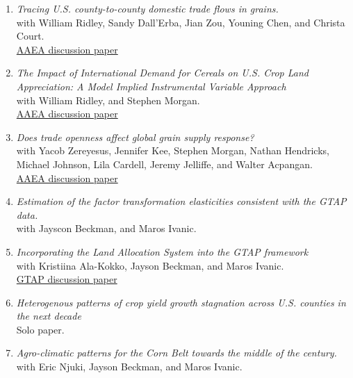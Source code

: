 \documentclass[11pt]{article}
\makeatletter
\newlength{\bibhang}
\newlength{\bibsep}
 {\@listi \global\bibsep\itemsep \global\advance\bibsep by\parsep}
\newenvironment{bibsection}%
        {\begin{enumerate}{}{%
       \setlength{\leftmargin}{\bibhang}%
       \setlength{\itemindent}{-\leftmargin}%
       \setlength{\itemsep}{\bibsep}%
       \setlength{\parsep}{\z@}%
        \setlength{\partopsep}{0pt}%
        \setlength{\topsep}{0pt}}}
        {\end{enumerate}\vspace{-.6\baselineskip}}
\makeatother
\begin{document}
\vspace{-.29cm} %

\begin{bibsection}
	
	\item {\textit{Tracing U.S. county-to-county domestic trade flows in grains.}} 
	\\with William Ridley, Sandy Dall'Erba, Jian Zou, Youning Chen, and Christa Court.
	\\ \href{https://ageconsearch.umn.edu/record/343526/files/27825.pdf}{AAEA discussion paper}
	
	
	\item {\textit{The Impact of International Demand for Cereals on U.S. Crop Land Appreciation: A Model Implied Instrumental Variable Approach}} 
	\\with William Ridley, and Stephen Morgan.
	\\ \href{https://ageconsearch.umn.edu/record/339478/files/Session%202%20Paper%201%20-%20Nava.pdf}{AAEA discussion paper}
	
	\item {\textit{Does trade openness affect global grain supply response?}}
	\\with Yacob Zereyesus, Jennifer Kee, Stephen Morgan, Nathan Hendricks, Michael Johnson, Lila Cardell, Jeremy Jelliffe, and Walter Acpangan.
	\\ \href{https://ageconsearch.umn.edu/record/335666/files/26732.pdf}{AAEA discussion paper}
	
	\item {\textit{Estimation of the factor transformation elasticities consistent with the GTAP data.}} 
	\\with Jayscon Beckman, and Maros Ivanic.
	
	 \item {\textit{Incorporating the Land Allocation System  into the GTAP framework}}
	\\with Kristiina Ala-Kokko, Jayson Beckman, and Maros Ivanic.
	\\ \href{	https://www.gtap.agecon.purdue.edu/resources/res_display.asp?RecordID=7301}{GTAP discussion paper}
	
     \item {\textit{Heterogenous patterns of crop yield growth stagnation across U.S. counties in the next decade}}
     \\ Solo paper.
   
   	\item {\textit{Agro-climatic patterns for the Corn Belt towards the middle of the century.}} 
   \\with Eric Njuki, Jayson Beckman, and Maros Ivanic.
    

\end{bibsection}
\end{document}
